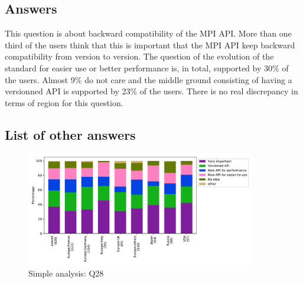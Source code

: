 
\subsection{Answers}


This question is about backward compatibility of the MPI API. More than one
third of the users think that this is important that the MPI API keep backward
compatibility from version to version. The question of the evolution of the
standard for easier use or better performance is, in total,  supported by 30\%
of the users. Almost 9\% do not care and the middle ground consisting of having
a versionned API is supported by 23\% of the users. There is no real discrepancy in
terms of region for this question. 

\subsection{List of other answers}
\begin{itemize}

\end{itemize}

\begin{figure}[htb]
\begin{center}
\includegraphics[width=10cm]{../pdfs/Q28.pdf}
\caption{Simple analysis: Q28}
\label{fig:Q28}
\end{center}
\end{figure}
